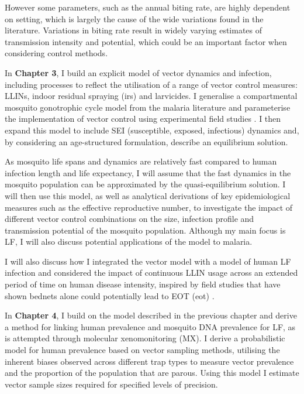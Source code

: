 However some parameters, such as the annual biting rate, are highly dependent on setting, which is largely the cause of the wide variations found in the literature. Variations in biting rate result in widely varying estimates of transmission intensity and potential, which could be an important factor when considering control methods.

In \textbf{Chapter 3}, I build an explicit model of vector dynamics and infection, including processes to reflect the utilisation of a range of vector control measures: LLINs, indoor residual spraying (\acrshort{irs}) and larvicides. I generalise a compartmental mosquito gonotrophic cycle model from the malaria literature \cite{Killeen2000} and parameterise the implementation of vector control using experimental field studies \cite{Ngufor2011,Kroeger1995}. I then expand this model to include SEI (susceptible, exposed, infectious) dynamics and, by considering an age-structured formulation, describe an equilibrium solution.

As mosquito life spans and dynamics are relatively fast compared to human infection length and life expectancy, I will assume that the fast dynamics in the mosquito population can be approximated by the quasi-equilibrium solution. I will then use this model, as well as analytical derivations of key epidemiological measures such as the effective reproductive number, to investigate the impact of different vector control combinations on the size, infection profile and transmission potential of the mosquito population. Although my main focus is LF, I will also discuss potential applications of the model to malaria.

I will also discuss how I integrated the vector model with a model of human LF infection and considered the impact of continuous LLIN usage across an extended period of time on human disease intensity, inspired by field studies that have shown bednets alone could potentially lead to \gls{EOT} (\acrshort{eot}) \cite{rebollo2015}.

In \textbf{Chapter 4}, I build on the model described in the previous chapter and derive a method for linking human prevalence and mosquito DNA prevalence for LF, as is attempted through molecular xenomonitoring (MX). I derive a probabilistic model for human prevalence based on vector sampling methods, utilising the inherent biases observed across different trap types to measure vector prevalence and the proportion of the population that are \gls{parous}. Using this model I estimate vector sample sizes required for specified levels of precision.

